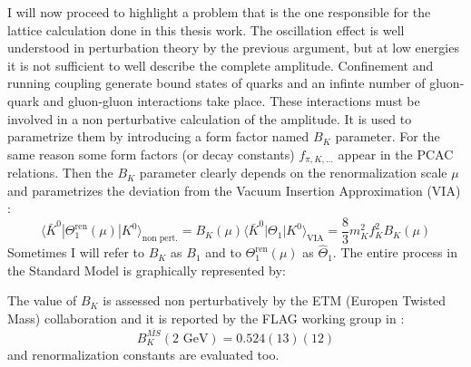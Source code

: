 \documentclass[english, LaM, oneside, noexaminfo]{sapthesis}
\newcommand{\la}{\langle}
\newcommand{\ra}{\rangle}
\newcommand{\gev}{\text{ GeV}}
\begin{document}
\newline
I will now proceed to highlight a problem that is the one responsible for the lattice calculation done in this thesis work.
The oscillation effect is well understood in perturbation theory by the previous argument, but at low energies it is not sufficient to well describe the complete amplitude.
Confinement and running coupling generate bound states of quarks and an infinte number of gluon-quark and gluon-gluon interactions take place.
These interactions must be involved in a non perturbative calculation of the amplitude.
It is used to parametrize them by introducing a form factor named $B_K$ parameter.
For the same reason some form factors (or decay constants) $f_{\pi,K,\dots}$ appear in the PCAC relations.
\newline
Then the $B_K$ parameter clearly depends on the renormalization scale $\mu$ and parametrizes the deviation from the Vacuum Insertion Approximation (VIA) \cite{BKetmcollaboration}:
\begin{equation}\label{eq:B_K-definition}
    \la \bar K^0 | \Theta_1^\text{ren} (\mu) | K^0 \ra_\text{non pert.} = B_K(\mu) \la \bar K^0 | \Theta_1 | K^0 \ra_\text{VIA} = \frac{8}{3} m_K^2 f_K^2 B_K(\mu)
\end{equation}
Sometimes I will refer to $B_K$ as $B_1$ and to $\Theta_1^\text{ren} (\mu)$ as $\hat\Theta_1$.
The entire process in the Standard Model is graphically represented by:
\begin{figure}[!h]
    \centering
\end{figure}
\newline
The value of $B_K$ is assessed non perturbatively by the ETM (Europen Twisted Mass) collaboration and it is reported by the FLAG working group in \cite{FLAG}\cite{ParticleDataGroup}:
\begin{equation}\label{B_K-value}
    B_K^{\overline{MS}}(2 \gev) = 0.524(13)(12)    
\end{equation}
and renormalization constants are evaluated too.
\end{document}
